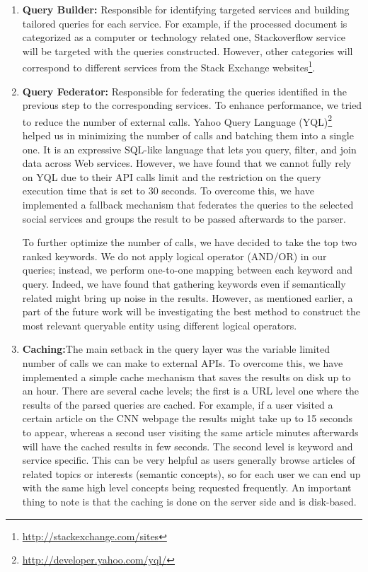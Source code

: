 \documentclass[oribibl]{../../Tools/LaTEX/llncs}
\begin{document}
\begin{enumerate}
\item {\bf Query Builder:} Responsible for identifying targeted services and building tailored queries for each service. For example, if the processed document is categorized as a computer or technology related one, Stackoverflow service will be targeted with the queries constructed. However, other categories will correspond to different services from the Stack Exchange websites\footnote{\url{http://stackexchange.com/sites}}.
\item {\bf Query Federator:} Responsible for federating the queries identified in the previous step to the corresponding services. To enhance performance, we tried to reduce the number of external calls. Yahoo Query Language (YQL)\footnote{\url{http://developer.yahoo.com/yql/}} helped us in minimizing the number of calls and batching them into a single one. It is an expressive SQL-like language that lets you query, filter, and join data across Web services. However, we have found that we cannot fully rely on YQL due to their API calls limit and the restriction on the query execution time that is set to 30 seconds. To overcome this, we have implemented a fallback mechanism that federates the queries to the selected social services and groups the result to be passed afterwards to the parser.

To further optimize the number of calls, we have decided to take the top two ranked keywords. We do not apply logical operator (AND/OR) in our queries; instead, we perform one-to-one mapping between each keyword and query. Indeed, we have found that gathering keywords even if semantically related might bring up noise in the results. However, as mentioned earlier, a part of the future work will be investigating the best method to construct the most relevant queryable entity using different logical operators.

\item {\bf Caching:}The main setback in the query layer was the variable limited number of calls we can make to external APIs. To overcome this, we have implemented a simple cache mechanism that saves the results on disk up to an hour. There are several cache levels; the first is a URL level one where the results of the parsed queries are cached. For example, if a user visited a certain article on the CNN webpage the results might take up to 15 seconds to appear, whereas a second user visiting the same article minutes afterwards will have the cached results in few seconds. The second level is keyword and service specific. This can be very helpful as users generally browse articles of related topics or interests (semantic concepts), so for each user we can end up with the same high level concepts being requested frequently. An important thing to note is that the caching is done on the server side and is disk-based.
\end{enumerate}
\end{document}
